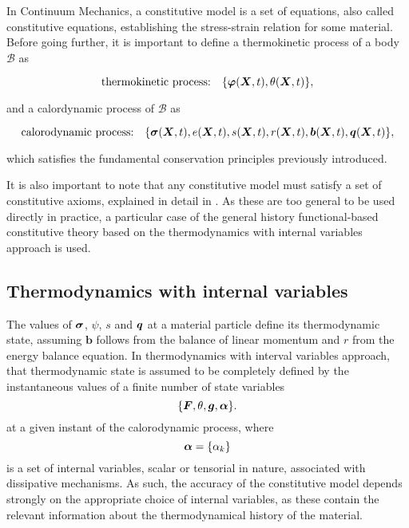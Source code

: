 In Continuum Mechanics, a constitutive model is a set of equations, also called constitutive equations, establishing the stress-strain relation for some material.
Before going further, it is important to define a thermokinetic process of a body $\mathscr{B}$ as
\begin{highlight}
    \begin{equation}
        \text{thermokinetic process:}\quad\{\bm{\varphi}(\bm{X}, t), \theta(\bm{X}, t)\},
    \end{equation}
\end{highlight}
and a calordynamic process of $\mathscr{B}$ as
\begin{highlight}
    \begin{equation}
        \text{calorodynamic process:}\quad \{\bm{\sigma}(\bm{X}, t), e(\bm{X}, t), s(\bm{X}, t), r(\bm{X}, t), \bm{b}(\bm{X},t), \bm{q}(\bm{X}, t)\},
    \end{equation}
\end{highlight}
which satisfies the fundamental conservation principles previously introduced.

It is also important to note that any constitutive model must satisfy a set of constitutive axioms, explained  in detail in \cite{de_souza_neto_computational_2008}.
As these are too general to be used directly in practice, a particular case of the general history functional-based constitutive theory based on the thermodynamics with internal variables approach is used.

\subsection{Thermodynamics with internal variables}

The values of $\bm{\sigma}$, $\psi$, $s$ and $\bm{q}$ at a material particle define its thermodynamic state, assuming \(\bm b\) follows from the balance of linear momentum and \(r\) from the energy balance equation.
In thermodynamics with interval variables approach, that thermodynamic state is assumed to be completely defined by the instantaneous values of a finite number of state variables
\begin{equation}
    \{\bm{F}, \theta, \bm{g}, \bm{\alpha}\}.
\end{equation}
at a given instant of the calorodynamic process, where
\begin{equation}
    \bm{\alpha} = \{\alpha_k\}
\end{equation}
is a set of internal variables, scalar or tensorial in nature, associated with dissipative mechanisms.
As such, the accuracy of the constitutive model depends strongly on the appropriate choice of internal variables, as these contain the relevant information about the thermodynamical history of the material.

